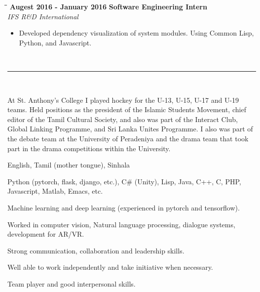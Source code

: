 \documentclass[a4paper,11pt]{article}
\begin{document}
\begin{tabbing}
  \=\hspace*{6cm}\=\hspace*{5cm}\= \kill
  \>\textbf{\large \textbar{}}\textbf{ Augest 2016 - January 2016} \> \textbf{Software Engineering Intern}\\\>\> \emph{IFS R\&D International}
\end{tabbing}
\vspace{-8pt}
\begin{itemize}
  \setlength\itemsep{0pt}
\item Developed dependency visualization of system modules. Using Common Lisp, Python, and Javascript.
\end{itemize}
\vspace{10pt}
\noindent\textbf{\large{}}
\vspace{-8pt}\noindent\\\rule{0.75\textwidth}{0.4pt}\\
\vspace{-8pt}
\begin{description}  
  \setlength\itemsep{0pt}
\item[Leadership Skills:] At St. Anthony’s College I played hockey for the U-13, U-15,
  U-17 and U-19 teams. Held positions as the president of the Islamic
  Students Movement, chief editor of the Tamil Cultural Society, and
  also was part of the Interact Club, Global Linking Programme, and
  Sri Lanka Unites Programme. I also was part of the debate team
  at the University of Peradeniya and the drama team that took part in
  the drama competitions within the University.
\item[Languages:] English, Tamil (mother tongue), Sinhala
\item [Technical skills:] Python (pytorch, flask, django, etc.), C\# (Unity), Lisp, Java, C++, C, PHP, Javascript, Matlab, Emacs, etc.
\item []Machine learning and deep learning (experienced in pytorch and tensorflow).
\item []Worked in computer vision,  Natural language processing, dialogue systems, development for AR/VR.
\item []Strong communication, collaboration and leadership skills.
\item []Well able to work independently and take initiative when necessary.
\item []Team player and good interpersonal skills.
\end{description}
\end{document}
